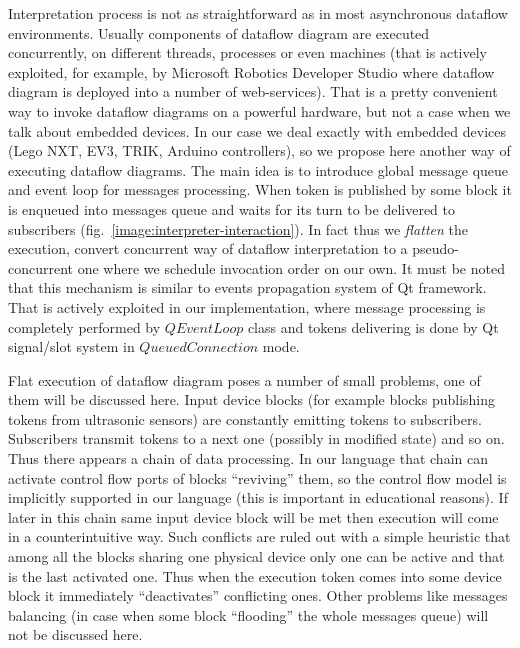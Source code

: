 \documentclass[conference,compsoc]{IEEEtran}
\begin{document}
Interpretation process is not as straightforward as in most asynchronous dataflow environments. Usually components of dataflow diagram are executed concurrently, on different threads, processes or even machines (that is actively exploited, for example, by Microsoft Robotics Developer Studio where dataflow diagram is deployed into a number of web-services). That is a pretty convenient way to invoke dataflow diagrams on a powerful hardware, but not a case when we talk about embedded devices. In our case we deal exactly with embedded devices (Lego NXT, EV3, TRIK, Arduino controllers), so we propose here another way of executing dataflow diagrams. The main idea is to introduce global message queue and event loop for messages processing. When token is published by some block it is enqueued into messages queue and waits for its turn to be delivered to subscribers (fig.~\ref{image:interpreter-interaction}). In fact thus we \textit{flatten} the execution, convert concurrent way of dataflow interpretation to a pseudo-concurrent one where we schedule invocation order on our own. It must be noted that this mechanism is similar to events propagation system of Qt framework. That is actively exploited in our implementation, where message processing is completely performed by $QEventLoop$ class and tokens delivering is done by Qt signal/slot system in $QueuedConnection$ mode. 

Flat execution of dataflow diagram poses a number of small problems, one of them will be discussed here. Input device blocks (for example blocks publishing tokens from ultrasonic sensors) are constantly emitting tokens to subscribers. Subscribers transmit tokens to a next one (possibly in modified state) and so on. Thus there appears a chain of data processing. In our language that chain can activate control flow ports of blocks ``reviving'' them, so the control flow model is implicitly supported in our language (this is important in educational reasons). If later in this chain same input device block will be met then execution will come in a 
counterintuitive way. Such conflicts are ruled out with a simple heuristic that among all the blocks sharing one physical device only one can be active and that is the last activated one. Thus when the execution token comes into some device block it immediately ``deactivates'' conflicting ones. Other problems like messages balancing (in case when some block ``flooding'' the whole messages queue) will not be discussed here.
\end{document}
